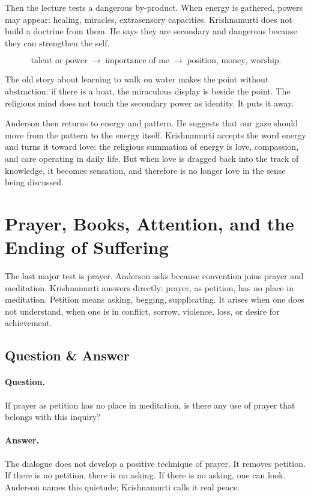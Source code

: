 Then the lecture tests a dangerous by-product. When energy is gathered, powers may appear: healing, miracles, extrasensory capacities. Krishnamurti does not build a doctrine from them. He says they are secondary and dangerous because they can strengthen the self.

\begin{equation}
\text{talent or power}
\;\longrightarrow\;
\text{importance of me}
\;\longrightarrow\;
\text{position, money, worship}.
\end{equation}

The old story about learning to walk on water makes the point without abstraction: if there is a boat, the miraculous display is beside the point. The religious mind does not touch the secondary power as identity. It puts it away.

Anderson then returns to energy and pattern. He suggests that our gaze should move from the pattern to the energy itself. Krishnamurti accepts the word energy and turns it toward love: the religious summation of energy is love, compassion, and care operating in daily life. But when love is dragged back into the track of knowledge, it becomes sensation, and therefore is no longer love in the sense being discussed.

\section{Prayer, Books, Attention, and the Ending of Suffering}

The last major test is prayer. Anderson asks because convention joins prayer and meditation. Krishnamurti answers directly: prayer, as petition, has no place in meditation. Petition means asking, begging, supplicating. It arises when one does not understand, when one is in conflict, sorrow, violence, loss, or desire for achievement.

\subsection{Question \& Answer}

\paragraph{Question.}
If prayer as petition has no place in meditation, is there any use of prayer that belongs with this inquiry?

\paragraph{Answer.}
The dialogue does not develop a positive technique of prayer. It removes petition. If there is no petition, there is no asking. If there is no asking, one can look. Anderson names this quietude; Krishnamurti calls it real peace.

